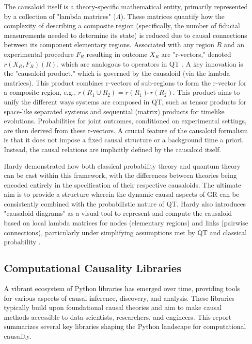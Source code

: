{{The causaloid itself is a theory-specific mathematical entity, primarily represented by a collection of "lambda matrices" ($\Lambda$). These matrices quantify how the complexity of describing a composite region (specifically, the number of fiducial measurements needed to determine its state) is reduced due to causal connections between its component elementary regions. Associated with any region $R$ and an experimental procedure $F_R$ resulting in outcome $X_R$ are "r-vectors," denoted $r(X_R, F_R)(R)$, which are analogous to operators in QT \cite{hardy2005probability}. A key innovation is the "causaloid product," which is governed by the causaloid (via the lambda matrices). This product combines r-vectors of sub-regions to form the r-vector for a composite region, e.g., $r(R_1 \cup R_2) = r(R_1) \hat{\;} r(R_2)$. This product aims to unify the different ways systems are composed in QT, such as tensor products for space-like separated systems and sequential (matrix) products for timelike evolutions. Probabilities for joint outcomes, conditioned on experimental settings, are then derived from these r-vectors. A crucial feature of the causaloid formalism is that it does not impose a fixed causal structure or a background time a priori. Instead, the causal relations are implicitly defined by the causaloid itself. 

Hardy demonstrated how both classical probability theory and quantum theory can be cast within this framework, with the differences between theories being encoded entirely in the specification of their respective causaloids. The ultimate aim is to provide a structure wherein the dynamic causal aspects of GR can be consistently combined with the probabilistic nature of QT. Hardy also introduces "causaloid diagrams" as a visual tool to represent and compute the causaloid based on local lambda matrices for nodes (elementary regions) and links (pairwise connections), particularly under simplifying assumptions met by QT and classical probability \cite{hardy2005probability}.

\newpage

\subsection{Computational Causality Libraries}

A vibrant ecosystem of Python libraries has emerged over time, providing tools for various aspects of causal inference, discovery, and analysis. These libraries typically build upon foundational causal theories and aim to make causal methods accessible to data scientists, researchers, and engineers. This report summarizes several key libraries shaping the Python landscape for computational causality.

}}
